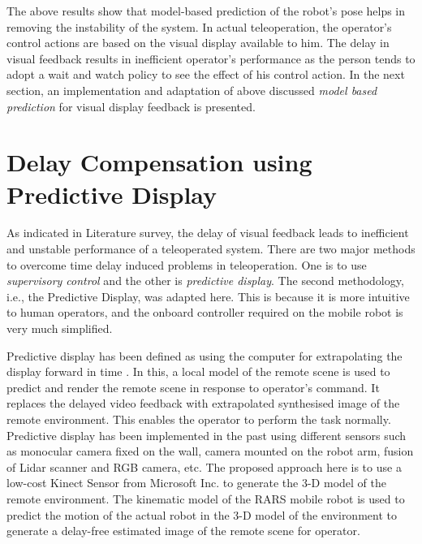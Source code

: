 The above results show that model-based prediction of the robot's pose helps in removing the instability of the system. In  actual teleoperation, the operator's control actions are based on the visual display available to him.  The delay in visual feedback results in inefficient operator's performance as the person tends to adopt a wait and watch policy to see the effect of his control action. In the next section,  an implementation and adaptation  of above discussed \textit{model based prediction }  for  visual display feedback is presented.   
  
\section{Delay Compensation using Predictive Display}
As indicated in  Literature survey,  the delay of visual feedback leads to inefficient and unstable performance of a teleoperated system. There are two major methods to overcome time delay induced problems in teleoperation. One is to use \textit{supervisory control} and the other is \textit{predictive display}. The second methodology, i.e., the Predictive Display, was adapted here. This is because it is more intuitive to human operators, and the onboard controller  required on the mobile robot is very much simplified.  

  
Predictive display has been defined as using the computer for extrapolating the display forward in time \cite{sheridan}. In this, a local model of the remote scene is used to predict and render the remote scene in response to operator's command. It replaces the delayed video feedback with extrapolated synthesised  image of the remote environment. This enables the operator to perform the task normally. Predictive display has been implemented in the past using different sensors such as monocular camera fixed on the wall, camera mounted on the robot arm, fusion of Lidar scanner and RGB camera, etc. 
The proposed approach here is to use a low-cost  Kinect Sensor from Microsoft Inc. to generate the 3-D model of the remote environment.  The kinematic model of the RARS mobile robot is used to predict the motion of the actual robot in the 3-D model of the environment  to generate a delay-free estimated image of the remote scene for operator.


